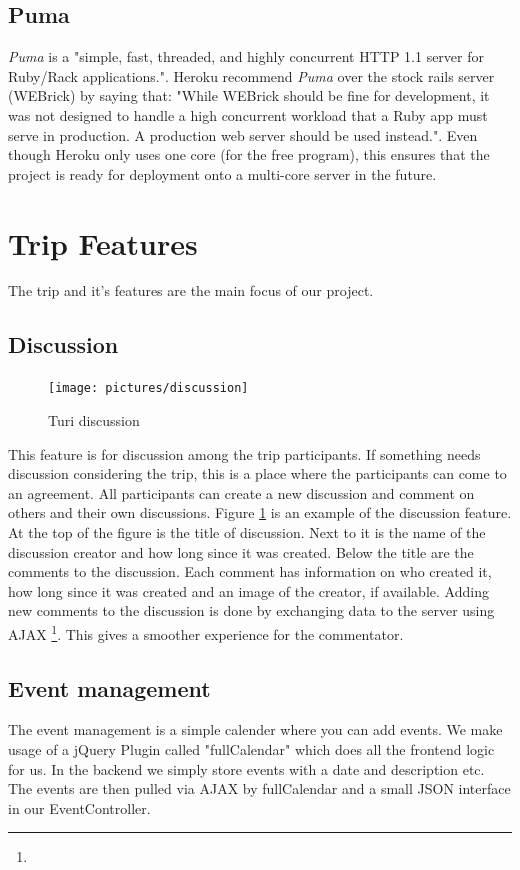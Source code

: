 \documentclass[a4paper]{article}
\begin{document}
\subsection{Puma}
\textit{Puma} is a "simple, fast, threaded, and highly concurrent HTTP 1.1 server for Ruby/Rack applications."\cite{puma}. Heroku recommend \textit{Puma} over the stock rails server (WEBrick) by saying that: "While WEBrick should be fine for development, it was not designed to handle a high concurrent workload that a Ruby app must serve in production. A production web server should be used instead."\cite{heroku_webserver}. Even though Heroku only uses one core (for the free program), this ensures that the project is ready for deployment onto a multi-core server in the future.  


\section{Trip Features}
The trip and it's features are the main focus of our project. 
\subsection{Discussion}

\begin{figure}%
  \begin{center}
    \vspace{-0pt}
    \texttt{[image: pictures/discussion]}
  \end{center}
\caption{Turi discussion}
\label{fig:discussion}
\end{figure}

This feature is for discussion among the trip participants. If something needs discussion considering the trip, this is a place where the participants can come to an agreement. All participants can create a new discussion and comment on others and their own discussions. Figure \ref{fig:discussion} is an example of the discussion feature. At the top of the figure is the title of discussion. Next to it is the name of the discussion creator and how long since it was created. Below the title are the comments to the discussion. Each comment has information on who created it, how long since it was created and an image of the creator, if available. Adding new comments to the discussion is done by exchanging data to the server using AJAX \footnote{\AJAX}. This gives a smoother experience for the commentator. 

\subsection{Event management}
The event management is a simple calender where you can add events. We make usage of a jQuery Plugin called "fullCalendar" which does all the frontend logic for us. In the backend we simply store events with a date and description etc. The events are then pulled via AJAX by fullCalendar and a small JSON interface in our EventController.
\end{document}
